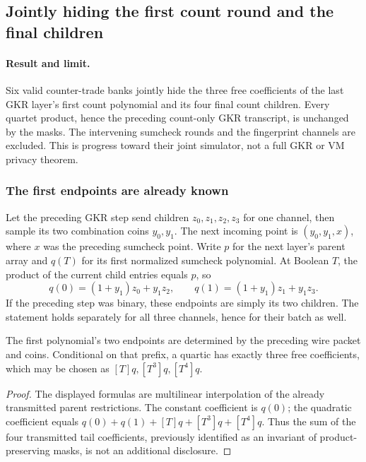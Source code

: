 \subsection{Jointly hiding the first count round and the final children}\label{note:zk-count-first-round}

\paragraph{Result and limit.} Six valid counter-trade banks jointly hide the three free coefficients of the last GKR layer's first count polynomial and its four final count children. Every quartet product, hence the preceding count-only GKR transcript, is unchanged by the masks. The intervening sumcheck rounds and the fingerprint channels are excluded. This is progress toward their joint simulator, not a full GKR or VM privacy theorem.

\subsubsection{The first endpoints are already known}

Let the preceding GKR step send children $z_0,z_1,z_2,z_3$ for one channel, then sample its two combination coins $y_0,y_1$. The next incoming point is $(y_0,y_1,x)$, where $x$ was the preceding sumcheck point. Write $p$ for the next layer's parent array and $q(T)$ for its first normalized sumcheck polynomial. At Boolean $T$, the product of the current child entries equals $p$, so
\[
 q(0)=(1+y_1)z_0+y_1z_2,
 \qquad q(1)=(1+y_1)z_1+y_1z_3.
\]
If the preceding step was binary, these endpoints are simply its two children. The statement holds separately for all three channels, hence for their batch as well.

\begin{lemma}
The first polynomial's two endpoints are determined by the preceding wire packet and coins. Conditional on that prefix, a quartic has exactly three free coefficients, which may be chosen as $[T]q,[T^3]q,[T^4]q$.
\end{lemma}
\begin{proof}
The displayed formulas are multilinear interpolation of the already transmitted parent restrictions. The constant coefficient is $q(0)$; the quadratic coefficient equals $q(0)+q(1)+[T]q+[T^3]q+[T^4]q$. Thus the sum of the four transmitted tail coefficients, previously identified as an invariant of product-preserving masks, is not an additional disclosure.
\end{proof}

